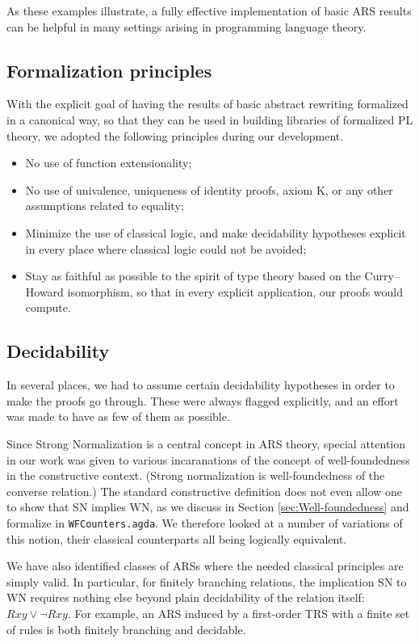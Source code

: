 As these examples illustrate, a fully effective implementation of basic ARS results
can be helpful in many settings arising in programming language theory.

\subsection{Formalization principles}
With the explicit goal of having the results of basic abstract rewriting
formalized in a canonical way, so that they can be used in building
libraries of formalized PL theory, we adopted the following
principles during our development.

\begin{itemize}
  \item No use of function extensionality;
  \item No use of univalence, uniqueness of identity proofs, axiom K, or any other
  assumptions related to equality;
  \item Minimize the use of classical logic, and make decidability hypotheses explicit in every place where classical logic could not be avoided;
  \item Stay as faithful as possible to the spirit of type theory based on the Curry--Howard isomorphism, so that in every explicit application, our proofs would compute.
\end{itemize}

\subsection{Decidability}
In several places, we had to assume certain decidability hypotheses in order to make
the proofs go through.  These were always flagged explicitly, and an effort was made to
have as few of them as possible.

Since Strong Normalization is a central concept in ARS theory,
special attention in our work was given to various incaranations of the concept of well-foundedness in the constructive context.
(Strong normalization is well-foundedness of the converse relation.)
The standard constructive definition does not even allow one to show that SN implies WN, as we discuss in Section \ref{sec:Well-foundedness} and formalize in \texttt{WFCounters.agda}.
  We therefore looked at a number of variations of this notion, their classical counterparts all being logically equivalent. %

We have also identified classes of ARSs where the needed classical principles are simply valid.  In particular, for finitely branching relations, the implication SN to WN requires nothing else beyond plain decidability of the relation itself: $Rxy \lor \lnot Rxy$.  For example, an ARS induced by a first-order TRS with a finite set of rules is both finitely branching and decidable.

